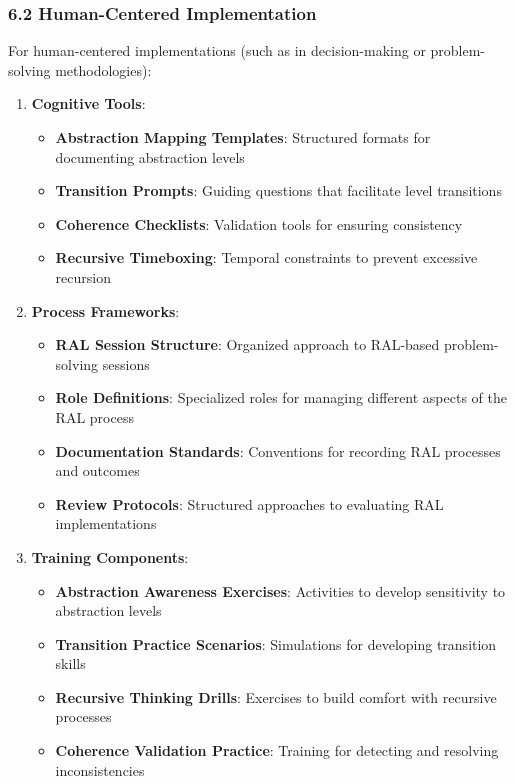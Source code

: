 \documentclass[
]{article}
\providecommand{\tightlist}{%
  \setlength{\itemsep}{0pt}\setlength{\parskip}{0pt}}
\begin{document}
\subsubsection{6.2 Human-Centered
Implementation}\label{human-centered-implementation}

For human-centered implementations (such as in decision-making or
problem-solving methodologies):

\begin{enumerate}
\def\labelenumi{\arabic{enumi}.}
\tightlist
\item
  \textbf{Cognitive Tools}:

  \begin{itemize}
  \tightlist
  \item
    \textbf{Abstraction Mapping Templates}: Structured formats for
    documenting abstraction levels
  \item
    \textbf{Transition Prompts}: Guiding questions that facilitate level
    transitions
  \item
    \textbf{Coherence Checklists}: Validation tools for ensuring
    consistency
  \item
    \textbf{Recursive Timeboxing}: Temporal constraints to prevent
    excessive recursion
  \end{itemize}
\item
  \textbf{Process Frameworks}:

  \begin{itemize}
  \tightlist
  \item
    \textbf{RAL Session Structure}: Organized approach to RAL-based
    problem-solving sessions
  \item
    \textbf{Role Definitions}: Specialized roles for managing different
    aspects of the RAL process
  \item
    \textbf{Documentation Standards}: Conventions for recording RAL
    processes and outcomes
  \item
    \textbf{Review Protocols}: Structured approaches to evaluating RAL
    implementations
  \end{itemize}
\item
  \textbf{Training Components}:

  \begin{itemize}
  \tightlist
  \item
    \textbf{Abstraction Awareness Exercises}: Activities to develop
    sensitivity to abstraction levels
  \item
    \textbf{Transition Practice Scenarios}: Simulations for developing
    transition skills
  \item
    \textbf{Recursive Thinking Drills}: Exercises to build comfort with
    recursive processes
  \item
    \textbf{Coherence Validation Practice}: Training for detecting and
    resolving inconsistencies
  \end{itemize}
\end{enumerate}
\end{document}
